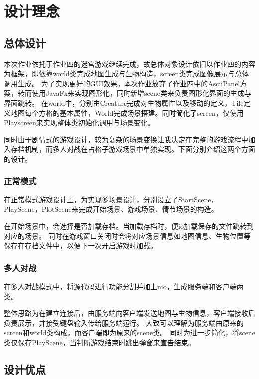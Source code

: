\documentclass{SCIS2022cn}
\begin{document}
\section{设计理念}

\subsection{总体设计}

本次作业依托于作业四的迷宫游戏继续完成，故总体对象设计依旧以作业四的内容为框架，即依靠world类完成地图生成与生物构造，screen类完成图像展示与总体调用生成。
为了实现更好的GUI效果，本次作业放弃了作业四中的AsciiPanel方案，转而使用JavaFx来实现图形化，同时新增scene类来负责图形化界面的生成与界面跳转。
在world中，分别由Creature完成对生物属性以及移动的定义，Tile定义地图每个方格的基本属性，World完成场景搭建。同时简化了screen，仅使用Playscreen来实现整体类初始化调用与场景变化。

同时由于剧情式的游戏设计，较为复杂的场景变换让我决定在完整的游戏流程中加入存档机制，而多人对战在占格子游戏场景中单独实现。下面分别介绍这两个方面的设计。

\subsubsection{正常模式}

在正常模式游戏设计上，为实现多场景设计，分别设立了StartScene，PlayScene，PlotScene来完成开始场景、游戏场景、情节场景的构造。

在开始场景中，会选择是否加载存档。当加载存档时，便io加载保存的文件跳转到对应的场景。
同时在游戏窗口关闭时会将对应场景信息如地图信息、生物位置等保存在存档文件中，以便下一次开启游戏时加载。

\subsubsection{多人对战}

在多人对战模式中，将源代码进行功能分割并加上nio，生成服务端和客户端两类。

整体思路为在建立连接后，由服务端向客户端发送地图与生物信息，客户端接收后负责展示，并接受键盘输入传给服务端运行。
大致可以理解为服务端由原来的screen和world类构成，而客户端即为原来的scene类。
同时为进一步简化，将scene类仅保存PlayScene，当判断游戏结束时跳出弹窗来宣告结束。

\subsection{设计优点}
\end{document}
